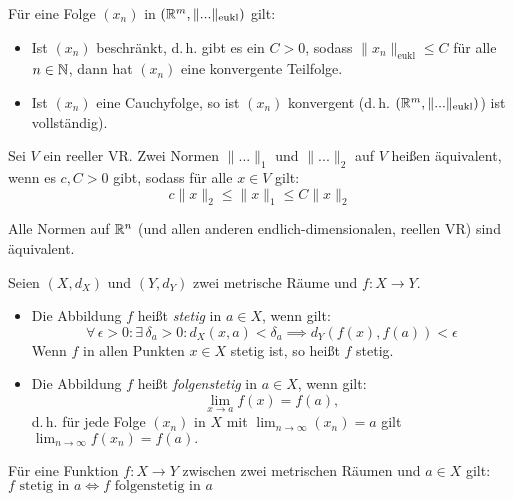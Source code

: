 \documentclass{cheat-sheet}
\begin{document}

\begin{satz}
Für eine Folge $(x_n)$ in $(\mathbb{R}^m, \| ... \|_{\text{eukl}})$ gilt:

\begin{itemize}
  \item Ist $(x_n)$ beschränkt, d.\,h. gibt es ein $C > 0$, sodass $\|x_n\|_{\text{eukl}} \le C$ für alle $n \in \mathbb{N}$, dann hat $(x_n)$ eine konvergente Teilfolge.
  \item Ist $(x_n)$ eine Cauchyfolge, so ist $(x_n)$ konvergent (d.\,h. $(\mathbb{R}^m, \| ... \|_{\text{eukl}})$) ist vollständig).
\end{itemize}
\end{satz}

\begin{defn}
Sei $V$ ein reeller VR. Zwei Normen $\| ... \|_1$ und $\| ... \|_2$ auf $V$ heißen äquivalent, wenn es $c, C > 0$ gibt, sodass für alle $x \in V$ gilt:
\[ c \| x \|_2 \le \| x \|_1 \le C \| x \|_2 \]
\end{defn}


\begin{satz}
Alle Normen auf $\mathbb{R}^n$ (und allen anderen endlich-dimensionalen, reellen VR) sind äquivalent.
\end{satz}

\begin{defn}
Seien $(X, d_X)$ und $(Y, d_Y)$ zwei metrische Räume und $f : X \to Y$.
\begin{itemize}
  \item Die Abbildung $f$ heißt \emph{stetig} in $a \in X$, wenn gilt:
  \[ \forall\,\epsilon > 0 : \exists\,\delta_a > 0 : d_X(x, a) < \delta_a \implies d_Y(f(x), f(a)) < \epsilon \]
  Wenn $f$ in allen Punkten $x \in X$ stetig ist, so heißt $f$ stetig.
  \item Die Abbildung $f$ heißt \emph{folgenstetig} in $a \in X$, wenn gilt:
  \[ \lim_{x \to a} f(x) = f(a), \]
  d.\,h. für jede Folge $(x_n)$ in $X$ mit $\lim_{n \to \infty} (x_n) = a$ gilt $\lim_{n \to \infty} f(x_n) = f(a).$
\end{itemize}
\end{defn}

\begin{satz}
Für eine Funktion $f : X \to Y$ zwischen zwei metrischen Räumen und $a \in X$ gilt:
$f \text{ stetig in } a \iff f \text{ folgenstetig in } a$
\end{satz}
\end{document}
